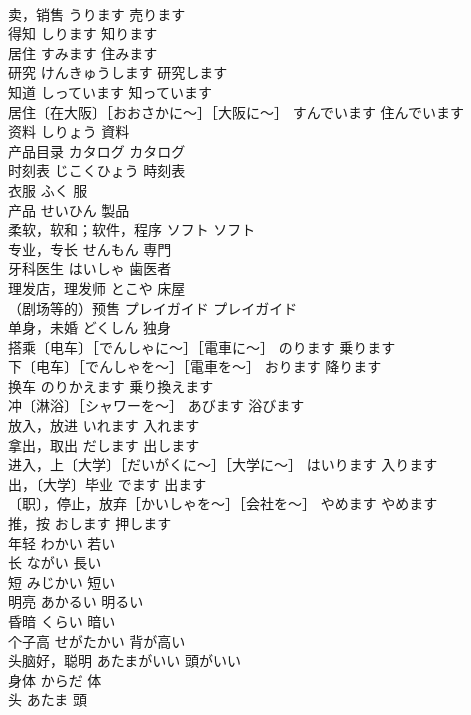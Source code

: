 \documentclass[8pt]{extreport}
\begin{document}
\begin{CJK}{UTF8}{min}
\\	卖，销售	うります	売ります
\\	得知	しります	知ります
\\	居住	すみます	住みます
\\	研究	けんきゅうします	研究します
\\	知道	しっています	知っています
\\	居住〔在大阪〕［おおさかに～］［大阪に～］	すんでいます	住んでいます
\\	资料	しりょう	資料
\\	产品目录	カタログ	カタログ
\\	时刻表	じこくひょう	時刻表
\\	衣服	ふく	服
\\	产品	せいひん	製品
\\	柔软，软和；软件，程序	ソフト	ソフト
\\	专业，专长	せんもん	専門
\\	牙科医生	はいしゃ	歯医者
\\	理发店，理发师	とこや	床屋
\\	（剧场等的）预售	プレイガイド	プレイガイド
\\	单身，未婚	どくしん	独身
\\	搭乘〔电车〕［でんしゃに～］［電車に～］	のります	乗ります
\\	下〔电车〕［でんしゃを～］［電車を～］	おります	降ります
\\	换车	のりかえます	乗り換えます
\\	冲〔淋浴〕［シャワーを～］	あびます	浴びます
\\	放入，放进	いれます	入れます
\\	拿出，取出	だします	出します
\\	进入，上〔大学〕［だいがくに～］［大学に～］	はいります	入ります
\\	出，〔大学〕毕业	でます	出ます
\\	〔职〕，停止，放弃［かいしゃを～］［会社を～］	やめます	やめます
\\	推，按	おします	押します
\\	年轻	わかい	若い
\\	长	ながい	長い
\\	短	みじかい	短い
\\	明亮	あかるい	明るい
\\	昏暗	くらい	暗い
\\	个子高	せがたかい	背が高い
\\	头脑好，聪明	あたまがいい	頭がいい
\\	身体	からだ	体
\\	头	あたま	頭

\end{CJK}
\end{document}
